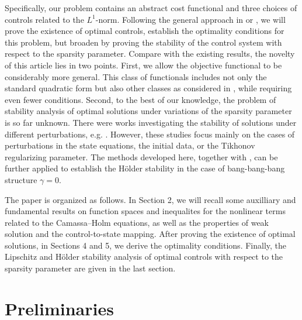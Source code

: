 \documentclass[reqno]{amsart}
\begin{document}
	Specifically, our problem contains an abstract cost functional and three choices of controls related to the $L^1$-norm.  Following the general approach in \cite{casas2017} or \cite{CHW2017}, we will prove the existence of optimal controls, establish the optimality conditions for this problem, but broaden by proving the stability of the control system with respect to the sparsity parameter. Compare with the existing results, the novelty of this article lies in two points. First, we allow the objective functional to be considerably more general. This class of functionals includes not only the standard quadratic form but also other classes as considered in \cite{AS2025}, while requiring even fewer conditions. Second, to the best of our knowledge, the problem of stability analysis of optimal solutions under variations of the sparsity parameter is so far unknown. There were works investigating the stability of solutions under different perturbations, e.g. \cite{AGS2025, bonnans2013perturbation, casas2015_2, CT2022}. However, these studies focus mainly on the cases of perturbations in the state equations, the initial data, or the Tikhonov regularizing parameter. The methods developed here, together with \cite{AGS2025}, can be further applied to establish the H\"older stability in the case of bang-bang-bang structure $\gamma=0$.
	
	The paper is organized as follows. In Section 2, we will recall some auxilliary and fundamental results on function spaces and inequalites for the nonlinear terms related to the Camassa--Holm equations, as well as the properties of weak solution and the control-to-state mapping. After proving the existence of optimal solutions, in Sections 4 and 5, we derive the optimality conditions. Finally, the Lipschitz and H\"older stability analysis of optimal controls with respect to the sparsity parameter are given in the last section.  
	
	\section{Preliminaries}
\end{document}
